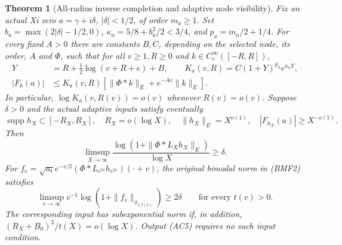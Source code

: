 \documentclass[11pt]{article}
\newtheorem{theorem}{Theorem}
\theoremstyle{remark}\newtheorem{remark}[theorem]{Remark}
\begin{document}
\begin{theorem}[All-radius inverse completion and adaptive node visibility]
\label{thm:adaptive-completion-radius}
Fix an actual Xi zero \(a=\gamma+i\delta\), \(|\delta|<1/2\), of order
\(m_a\ge1\). Set
\(b_a=\max(2|\delta|-1/2,0)\), \(\kappa_a=5/8+b_a^2/2<3/4\),
and \(p_a=m_a/2+1/4\). For every fixed \(A>0\) there are constants
\(B,C\), depending on the selected node, its order, \(A\) and \(\Phi\),
such that for all \(v\ge1,R\ge0\) and \(k\in C_c^\infty([-R,R])\),
\[
 \begin{split}
 Y&=R+\tfrac12\log(v+R+e)+B,\qquad
 K_a(v,R)=C(1+Y)^{p_a}e^{\kappa_aY},\\
 |F_k(a)|&\le K_a(v,R)
          [\|\Phi*k\|_E+e^{-Av}\|k\|_E].
 \end{split}                                               \tag{AC2}
\]
In particular, \(\log K_a(v,R(v))=o(v)\) whenever \(R(v)=o(v)\).
Suppose \(\delta>0\) and the actual adaptive inputs satisfy eventually
\[
 \operatorname{supp}h_X\subset[-R_X,R_X],\quad R_X=o(\log X),
 \quad\|h_X\|_E=X^{o(1)},\quad |F_{h_X}(a)|\ge X^{-o(1)}.
                                                               \tag{AC3}
\]
Then
\[
 \limsup_{X\to\infty}
   \frac{\log(1+\|\Phi*L_Xh_X\|_E)}{\log X}\ge\delta .       \tag{AC4}
\]
For \(f_v=\sqrt{a_t}e^{-v/2}(\Phi*L_{e^{2v}}h_{e^{2v}})(\cdot+v)\),
the original bimodal norm in (BMF2) satisfies
\[
 \limsup_{v\to\infty}v^{-1}\log(1+\|f_v\|_{\phi_{v,t(v)}})
     \ge2\delta\qquad\text{for every }t(v)>0.              \tag{AC5}
\]
The corresponding input has subexponential norm if, in addition,
\((R_X+B_0)^2/t(X)=o(\log X)\). Output (AC5) requires no such input
condition.
\end{theorem}
\end{document}
